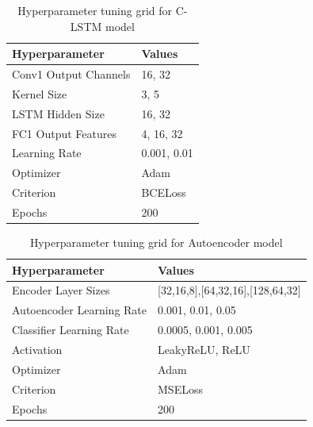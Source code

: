 \documentclass[10pt,twocolumn,letterpaper]{article}
\begin{document}
\begin{table}[h]
   \centering
   \caption{Hyperparameter tuning grid for C-LSTM model}
   \label{clstm-tuning-matrix}
   \begin{tabular}{|l|l|}
   \hline
   \textbf{Hyperparameter}   & \textbf{Values}         \\ \hline
   Conv1 Output Channels     & 16, 32                  \\ \hline
   Kernel Size               & 3, 5                    \\ \hline
   LSTM Hidden Size          & 16, 32                  \\ \hline
   FC1 Output Features       & 4, 16, 32               \\ \hline
   Learning Rate             & 0.001, 0.01             \\ \hline
   Optimizer                 & Adam             \\ \hline
   Criterion                 & BCELoss                 \\ \hline
   Epochs                    & 200                     \\ \hline
   \end{tabular}
   \end{table}

\begin{table}[h]
      \centering
      \caption{Hyperparameter tuning grid for Autoencoder model}
      \label{autoenc-tuning-matrix}
      \begin{tabular}{|l|l|}
      \hline
      \textbf{Hyperparameter}               & \textbf{Values}                                 \\ \hline
      Encoder Layer Sizes                   & \small{[32,16,8],[64,32,16],[128,64,32]}       \\ \hline
      \small{Autoencoder Learning Rate}           & 0.001, 0.01, 0.05                               \\ \hline
      \small{Classifier Learning Rate}            & 0.0005, 0.001, 0.005                            \\ \hline
      Activation                            & LeakyReLU, ReLU                                 \\ \hline
      Optimizer                             & Adam                                            \\ \hline
      Criterion                             & MSELoss                                         \\ \hline
      Epochs                                & 200                                             \\ \hline
      \end{tabular}
      \end{table}
\end{document}
